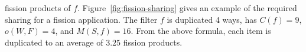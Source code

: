 \noindent fission products of $f$.  Figure~\ref{fig:fission-sharing}
gives an example of the required sharing for a fission application.
The filter $f$ is duplicated 4 ways, has $C(f) = 9$, $o(W, F) = 4$,
and $M(S, f) = 16$.  From the above formula, each item is duplicated
to an average of $3.25$ fission products.

